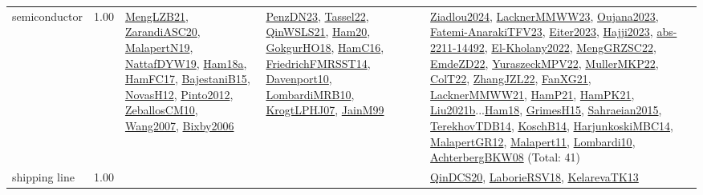 {\begin{longtable}{p{3cm}r>{\raggedright\arraybackslash}p{6cm}>{\raggedright\arraybackslash}p{6cm}>{\raggedright\arraybackslash}p{8cm}}
\index{semiconductor}\index{ApplicationAreas!semiconductor}semiconductor &  1.00 & \hyperref[detail:MengLZB21]{MengLZB21}, \hyperref[detail:ZarandiASC20]{ZarandiASC20}, \hyperref[detail:MalapertN19]{MalapertN19}, \hyperref[detail:NattafDYW19]{NattafDYW19}, \hyperref[detail:Ham18a]{Ham18a}, \hyperref[detail:HamFC17]{HamFC17}, \hyperref[detail:BajestaniB15]{BajestaniB15}, \hyperref[detail:NovasH12]{NovasH12}, \hyperref[detail:Pinto2012]{Pinto2012}, \hyperref[detail:ZeballosCM10]{ZeballosCM10}, \hyperref[detail:Wang2007]{Wang2007}, \hyperref[detail:Bixby2006]{Bixby2006} & \hyperref[detail:PenzDN23]{PenzDN23}, \hyperref[detail:Tassel22]{Tassel22}, \hyperref[detail:QinWSLS21]{QinWSLS21}, \hyperref[detail:Ham20]{Ham20}, \hyperref[detail:GokgurHO18]{GokgurHO18}, \hyperref[detail:HamC16]{HamC16}, \hyperref[detail:FriedrichFMRSST14]{FriedrichFMRSST14}, \hyperref[detail:Davenport10]{Davenport10}, \hyperref[detail:LombardiMRB10]{LombardiMRB10}, \hyperref[detail:KrogtLPHJ07]{KrogtLPHJ07}, \hyperref[detail:JainM99]{JainM99} & \hyperref[detail:Ziadlou2024]{Ziadlou2024}, \hyperref[detail:LacknerMMWW23]{LacknerMMWW23}, \hyperref[detail:Oujana2023]{Oujana2023}, \hyperref[detail:Fatemi-AnarakiTFV23]{Fatemi-AnarakiTFV23}, \hyperref[detail:Eiter2023]{Eiter2023}, \hyperref[detail:Hajji2023]{Hajji2023}, \hyperref[detail:abs-2211-14492]{abs-2211-14492}, \hyperref[detail:El-Kholany2022]{El-Kholany2022}, \hyperref[detail:MengGRZSC22]{MengGRZSC22}, \hyperref[detail:EmdeZD22]{EmdeZD22}, \hyperref[detail:YuraszeckMPV22]{YuraszeckMPV22}, \hyperref[detail:MullerMKP22]{MullerMKP22}, \hyperref[detail:ColT22]{ColT22}, \hyperref[detail:ZhangJZL22]{ZhangJZL22}, \hyperref[detail:FanXG21]{FanXG21}, \hyperref[detail:LacknerMMWW21]{LacknerMMWW21}, \hyperref[detail:HamP21]{HamP21}, \hyperref[detail:HamPK21]{HamPK21}, \hyperref[detail:Liu2021b]{Liu2021b}...\hyperref[detail:Ham18]{Ham18}, \hyperref[detail:GrimesH15]{GrimesH15}, \hyperref[detail:Sahraeian2015]{Sahraeian2015}, \hyperref[detail:TerekhovTDB14]{TerekhovTDB14}, \hyperref[detail:KoschB14]{KoschB14}, \hyperref[detail:HarjunkoskiMBC14]{HarjunkoskiMBC14}, \hyperref[detail:MalapertGR12]{MalapertGR12}, \hyperref[detail:Malapert11]{Malapert11}, \hyperref[detail:Lombardi10]{Lombardi10}, \hyperref[detail:AchterbergBKW08]{AchterbergBKW08} (Total: 41)\\
\index{shipping line}\index{ApplicationAreas!shipping line}shipping line &  1.00 &  &  & \hyperref[detail:QinDCS20]{QinDCS20}, \hyperref[detail:LaborieRSV18]{LaborieRSV18}, \hyperref[detail:KelarevaTK13]{KelarevaTK13}\\

\end{longtable}}
